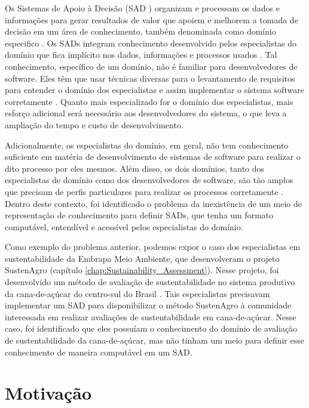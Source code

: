 Os Sistemas de Apoio à Decisão (SAD ) organizam e processam os dados
e informações para gerar resultados de valor que apoiem e melhorem
a tomada de decisão em um área de conhecimento, também denominada
como domínio especifico \citep{Turban:2004:DSS:994103}. Os SADs integram
conhecimento desenvolvido pelos especialistas do domínio que fica
implícito nos dados, informações e processos usados \citep{power2000web}.
Tal conhecimento, específico de um domínio, não é familiar para desenvolvedores
de software. Eles têm que usar técnicas diversas para o levantamento
de requisitos para entender o domínio dos especialistas e assim implementar
o sistema software corretamente \citep{GavrilovaAndreeva2012}. Quanto
mais especializado for o domínio dos especialistas, mais esforço adicional
será necessário aos desenvolvedores do sistema, o que leva a ampliação
do tempo e custo de desenvolvimento. 

Adicionalmente, os especialistas do domínio, em geral, não tem conhecimento
suficiente em matéria de desenvolvimento de sistemas de software para
realizar o dito processo por eles mesmos. Além disso, os dois domínios,
tanto dos especialistas de domínio como dos desenvolvedores de software,
são tão amplos que precisam de perfis particulares para realizar os
processos corretamente \citep{roussey2010ontologies}. Dentro deste
contexto, foi identificado o problema da inexistência de um meio de
representação de conhecimento para definir SADs, que tenha um formato
computável, entendível e acessível pelos especialistas do domínio.

Como exemplo do problema anterior, podemos expor o caso dos especialistas
em sustentabilidade da Embrapa Meio Ambiente, que desenvolveram o
projeto SustenAgro (capítulo \ref{chap:Sustainability_Assessment}).
Nesse projeto, foi desenvolvido um método de avaliação de sustentabilidade
no sistema produtivo da cana-de-açúcar do centro-sul do Brasil \citep{oliveira:2013}.
Tais especialistas precisavam implementar um SAD para disponibilizar
o método SustenAgro à comunidade interessada em realizar avaliações
de sustentabilidade em cana-de-açúcar. Nesse caso, foi identificado
que eles possuíam o conhecimento do domínio de avaliação de sustentabilidade
da cana-de-açúcar, mas não tinham um meio para definir esse conhecimento
de maneira computável em um SAD.

\section{Motivação}

